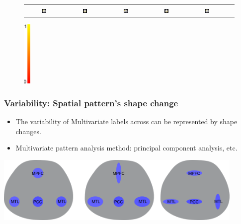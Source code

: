 \documentclass[serif]{beamer}
\begin{document}
\begin{frame}
\begin{figure}[htb]
\begin{tabular}[b]{cc|cc|cc}
    \includegraphics[width=0.12\textwidth]{figure3/atten_s} &
    \includegraphics[width=0.12\textwidth]{figure3/atten_sub17_a} &
    \includegraphics[width=0.12\textwidth]{figure3/atten_sub17_s} &
    \includegraphics[width=0.12\textwidth]{figure3/atten_sub21_a} &
    \includegraphics[width=0.12\textwidth]{figure3/atten_sub21_s} 
  \end{tabular}
  \includegraphics[width=0.03\textwidth]{figure3/colorbar}
\end{figure}
\end{frame}

\begin{frame}
\frametitle{Variability: Spatial pattern's shape change}
\begin{block}{}
  \begin{itemize}
  \item The variability of Multivariate labels across can be represented by shape changes.
  \item Multivariate pattern analysis method: principal component analysis, etc.
  \end{itemize}
\end{block}
\vspace{10pt}
\includegraphics[width=0.9\textwidth]{sfig/vari}
\end{frame}
\end{document}
